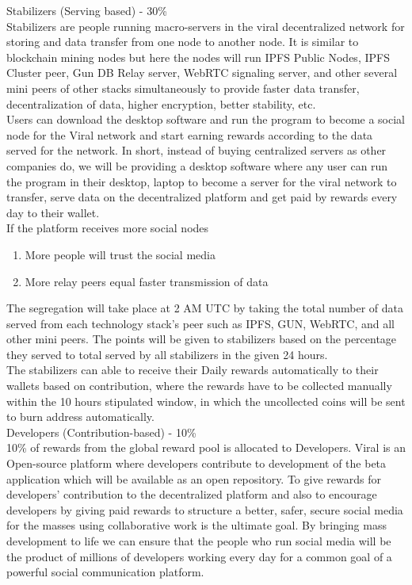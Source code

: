 \documentclass[10pt]{article}
\begin{document}
Stabilizers (Serving based) - 30\%\\

Stabilizers are people running macro-servers in the viral decentralized network for storing and data transfer from one node to another node. It is similar to blockchain mining nodes but here the nodes will run IPFS Public Nodes, IPFS Cluster peer, Gun DB Relay server, WebRTC signaling server, and other several mini peers of other stacks simultaneously to provide faster data transfer, decentralization of data, higher encryption, better stability, etc. \\

Users can download the desktop software and run the program to become a social node for the Viral network and start earning rewards according to the data served for the network. In short, instead of buying centralized servers as other companies do, we will be providing a desktop software where any user can run the program in their desktop, laptop to become a server for the viral network to transfer, serve data on the decentralized platform and get paid by rewards every day to their wallet.\\

If the platform receives more social nodes\\
\begin{enumerate}[leftmargin=+0.2in]
\item More people will trust the social media
\item More relay peers equal faster transmission of data
\end{enumerate}


The segregation will take place at 2 AM UTC by taking the total number of data served from each technology stack's peer such as IPFS, GUN, WebRTC, and all other mini peers. The points will be given to stabilizers based on the percentage they served to total served by all stabilizers in the given 24 hours. \\

The stabilizers can able to receive their Daily rewards automatically to their wallets based on contribution, where the rewards have to be collected manually within the 10 hours stipulated window, in which the uncollected coins will be sent to burn address automatically.\\


Developers (Contribution-based) - 10\%\\

10\% of rewards from the global reward pool is allocated to Developers. Viral is an Open-source platform where developers contribute to development of the beta application which will be available as an open repository. To give rewards for developers' contribution to the decentralized platform and also to encourage developers by giving paid rewards to structure a better, safer, secure social media for the masses using collaborative work is the ultimate goal. By bringing mass development to life we can ensure that the people who run social media will be the product of millions of developers working every day for a common goal of a powerful social communication platform.\\
\end{document}
